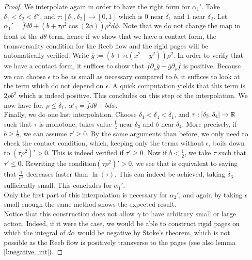 \documentclass[../main.tex]{subfiles}
\begin{document}
\begin{proof}
We interpolate again in order to have the right form for $\alpha_1'$. Take $\delta_1<\delta_2<\delta ''$, and $\tau : [\delta_1,\delta_2] \rightarrow [0,1]$ which is $0$ near $\delta_1$ and $1$ near $\delta_2$. Let $\alpha_1' = \overline{f}d\theta + (b+\tau\rho^2\cos(2\phi))\rho^2d\phi$. Note that we do not change the map in front of the $d\theta$ term, hence if we show that we have a contact form, the transversality condition for the Reeb flow and the rigid pages will be automatically verified. Write $\overline{g} := (b+\tau \epsilon (x^2 - y^2))\rho^2$. In order to verify that we have a contact form, it suffices to show that $\overline{f}\partial_\rho \overline{g} - \overline{g}\partial_\rho \overline{f}$ is positive. Because we can choose $\epsilon$ to be as small as necessary compared to $b$, it suffices to look at the term which do not depend on $\epsilon$. A quick computation yields that this term is $2\rho b^2$ which is indeed positive. This concludes on this step of the interpolation. We now have for, $\rho\leq \delta_1$, $\alpha'_1 = \overline{f}d\theta + bd\phi$. \\

Finally, we do one last interpolation. Choose $\delta_3 < \delta _4< \delta_1$, and $\tau :[\delta_3,\delta_4]\rightarrow \mathbb{R}$ such that $\tau$ is monotone, takes value $\frac{1}{2}$ near $\delta_3$ and $b$ near $\delta_4$. More precisely, if $b\geq \frac{1}{2}$, we can assume $\tau' \geq 0$. By the same arguments than before, we only need to check the contact condition, which, keeping only the terms without $\epsilon$, boils down to $(\tau\rho^2)'> 0$. This is indeed verified if $\tau'\geq 0$. Now if $b< \frac{1}{2}$, we take $\tau$ such that $\tau'\leq 0$. Rewriting the condition$(\tau \rho^2)'> 0$, we see that is equivalent to saying that $\frac{1}{\rho^2}$ decreases faster than $\ln(\tau)$. This can indeed be achieved, taking $\delta_3$ sufficiently small. This concludes for $\alpha_1'$.\\

Only the first part of this interpolation is necessary for $\alpha_2'$, and again by taking $\epsilon$ small enough the same method shows the expected result.\\

Notice that this construction does not allow $\gamma$ to have arbitrary small or large action. Indeed, if it were the case, we would be able to construct rigid pages on which the integral of $d\alpha$ would be negative by Stoke's theorem, which is not possible as the Reeb flow is positively transverse to the pages (see also lemma \ref{l:negative_int}).
\end{proof}
\end{document}
